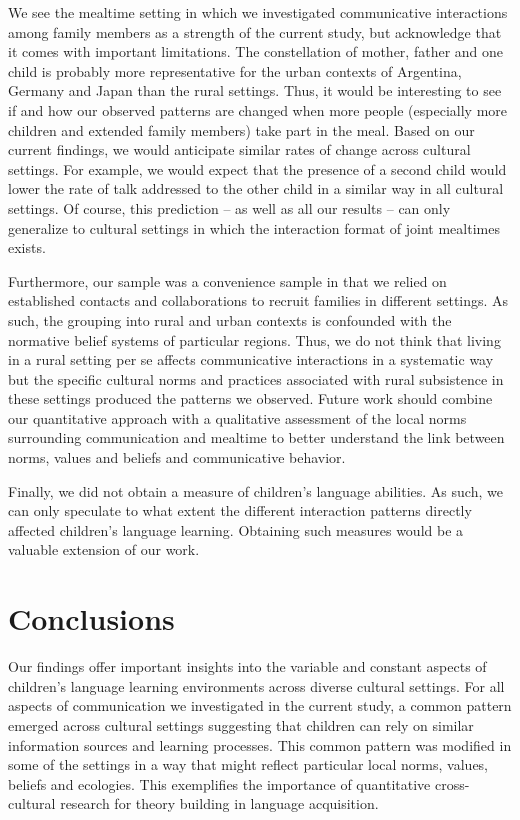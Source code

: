\documentclass[
  man,floatsintext]{apa6}
\begin{document}
We see the mealtime setting in which we investigated communicative interactions among family members as a strength of the current study, but acknowledge that it comes with important limitations. The constellation of mother, father and one child is probably more representative for the urban contexts of Argentina, Germany and Japan than the rural settings. Thus, it would be interesting to see if and how our observed patterns are changed when more people (especially more children and extended family members) take part in the meal. Based on our current findings, we would anticipate similar rates of change across cultural settings. For example, we would expect that the presence of a second child would lower the rate of talk addressed to the other child in a similar way in all cultural settings. Of course, this prediction -- as well as all our results -- can only generalize to cultural settings in which the interaction format of joint mealtimes exists.

Furthermore, our sample was a convenience sample in that we relied on established contacts and collaborations to recruit families in different settings. As such, the grouping into rural and urban contexts is confounded with the normative belief systems of particular regions. Thus, we do not think that living in a rural setting per se affects communicative interactions in a systematic way but the specific cultural norms and practices associated with rural subsistence in these settings produced the patterns we observed. Future work should combine our quantitative approach with a qualitative assessment of the local norms surrounding communication and mealtime to better understand the link between norms, values and beliefs and communicative behavior.

Finally, we did not obtain a measure of children's language abilities. As such, we can only speculate to what extent the different interaction patterns directly affected children's language learning. Obtaining such measures would be a valuable extension of our work.

\hypertarget{conclusions}{%
\section{Conclusions}\label{conclusions}}

Our findings offer important insights into the variable and constant aspects of children's language learning environments across diverse cultural settings. For all aspects of communication we investigated in the current study, a common pattern emerged across cultural settings suggesting that children can rely on similar information sources and learning processes. This common pattern was modified in some of the settings in a way that might reflect particular local norms, values, beliefs and ecologies. This exemplifies the importance of quantitative cross-cultural research for theory building in language acquisition.
\end{document}

